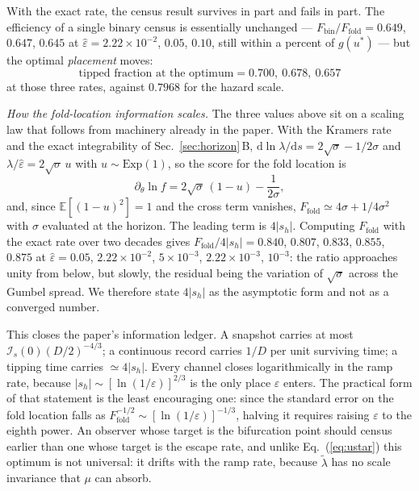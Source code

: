 \documentclass[%
 aip,
 cha,
 amsmath,amssymb,
 reprint,
 superscriptaddress,
 floatfix,
]{revtex4-2}
\newcommand{\dd}{\mathrm{d}}
\newcommand{\Ifish}{\mathcal{I}}
\newcommand{\Sig}{\hat\varepsilon}
\newcommand{\E}{\mathbb{E}}
\begin{document}
With the exact rate, the census result survives in part and fails in part.  The efficiency of a single binary census is essentially unchanged --- $F_{\mathrm{bin}}/F_{\mathrm{fold}}=0.649$, $0.647$, $0.645$ at $\Sig=2.22\times10^{-2}$, $0.05$, $0.10$, still within a percent of $g(u^\ast)$ --- but the optimal \emph{placement} moves:
\begin{equation}
\label{eq:foldopt}
\text{tipped fraction at the optimum}=0.700,\ 0.678,\ 0.657
\end{equation}
at those three rates, against $0.7968$ for the hazard scale.

\emph{How the fold-location information scales.}  The three values above sit on a scaling law that follows from machinery already in the paper.  With the Kramers rate and the exact integrability of Sec.~\ref{sec:horizon}\,B, $\dd\ln\lambda/\dd s=2\sqrt\sigma-1/2\sigma$ and $\lambda/\Sig=2\sqrt\sigma\,u$ with $u\sim\mathrm{Exp}(1)$, so the score for the fold location is
\begin{equation}
\label{eq:foldscore}
\partial_\theta\ln f=2\sqrt\sigma\,(1-u)-\frac{1}{2\sigma},
\end{equation}
and, since $\E[(1-u)^2]=1$ and the cross term vanishes, $F_{\mathrm{fold}}\simeq4\sigma+1/4\sigma^2$ with $\sigma$ evaluated at the horizon.  The leading term is $4|s_h|$.  Computing $F_{\mathrm{fold}}$ with the exact rate over two decades gives $F_{\mathrm{fold}}/4|s_h|=0.840$, $0.807$, $0.833$, $0.855$, $0.875$ at $\Sig=0.05$, $2.22\times10^{-2}$, $5\times10^{-3}$, $2.22\times10^{-3}$, $10^{-3}$: the ratio approaches unity from below, but slowly, the residual being the variation of $\sqrt\sigma$ across the Gumbel spread.  We therefore state $4|s_h|$ as the asymptotic form and not as a converged number.

This closes the paper's information ledger.  A snapshot carries at most $\Ifish_s(0)(D/2)^{-4/3}$; a continuous record carries $1/D$ per unit surviving time; a tipping time carries $\simeq4|s_h|$.  Every channel closes logarithmically in the ramp rate, because $|s_h|\sim[\ln(1/\varepsilon)]^{2/3}$ is the only place $\varepsilon$ enters.  The practical form of that statement is the least encouraging one: since the standard error on the fold location falls as $F_{\mathrm{fold}}^{-1/2}\sim[\ln(1/\varepsilon)]^{-1/3}$, halving it requires raising $\varepsilon$ to the eighth power.  An observer whose target is the bifurcation point should census earlier than one whose target is the escape rate, and unlike Eq.~(\ref{eq:ustar}) this optimum is not universal: it drifts with the ramp rate, because $\tilde\lambda$ has no scale invariance that $\mu$ can absorb.
\end{document}
